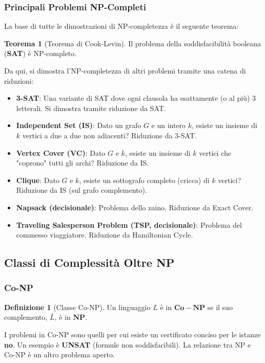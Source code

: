 \documentclass[a4paper]{article}
\theoremstyle{definition} %
\newtheorem{theorem}{Teorema}
\newtheorem{definition}{Definizione}
\begin{document}
\subsubsection{Principali Problemi NP-Completi}
La base di tutte le dimostrazioni di NP-completezza è il seguente teorema:
\begin{theorem}[Teorema di Cook-Levin]
Il problema della soddisfacibilità booleana (\textbf{SAT}) è NP-completo.
\end{theorem}
Da qui, si dimostra l'NP-completezza di altri problemi tramite una catena di riduzioni:
\begin{itemize}
    \item \textbf{3-SAT}: Una variante di SAT dove ogni clausola ha esattamente (o al più) 3 letterali. Si dimostra tramite riduzione da SAT.
    \item \textbf{Independent Set (IS)}: Dato un grafo $G$ e un intero $k$, esiste un insieme di $k$ vertici a due a due non adiacenti? Riduzione da 3-SAT.
    \item \textbf{Vertex Cover (VC)}: Dato $G$ e $k$, esiste un insieme di $k$ vertici che "coprono" tutti gli archi? Riduzione da IS.
    \item \textbf{Clique}: Dato $G$ e $k$, esiste un sottografo completo (cricca) di $k$ vertici? Riduzione da IS (sul grafo complemento).
    \item \textbf{Napsack (decisionale)}: Problema dello zaino. Riduzione da Exact Cover.
    \item \textbf{Traveling Salesperson Problem (TSP, decisionale)}: Problema del commesso viaggiatore. Riduzione da Hamiltonian Cycle.
\end{itemize}

\subsection{Classi di Complessità Oltre NP}
\subsubsection{Co-NP}
\begin{definition}[Classe Co-NP]
Un linguaggio $L$ è in $\mathbf{Co-NP}$ se il suo complemento, $\bar{L}$, è in $\mathbf{NP}$.
\end{definition}
I problemi in Co-NP sono quelli per cui esiste un certificato conciso per le istanze \textbf{no}. Un esempio è \textbf{UNSAT} (formule non soddisfacibili). La relazione tra NP e Co-NP è un altro problema aperto.
\end{document}
